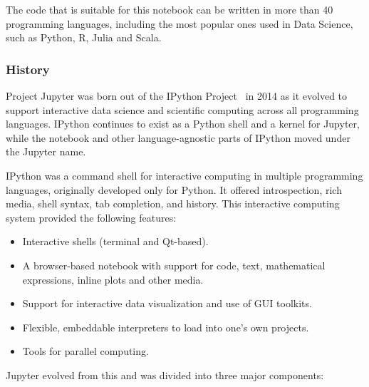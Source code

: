 The code that is suitable for this notebook can be written in more than 40 programming
languages, including the most popular ones used in Data Science, such as Python, R, Julia
and Scala.

\subsubsection{History}

Project Jupyter was born out of the IPython Project~\cite{ipython:on,ipython-wikipedia:on}
in 2014 as it evolved to support interactive data science and scientific computing across
all programming languages.  IPython continues to exist as a Python shell and a kernel for
Jupyter, while the notebook and other language-agnostic parts of IPython moved under the
Jupyter name.

IPython was a command shell for interactive computing in multiple programming languages,
originally developed only for Python. It offered introspection, rich media, shell syntax,
tab completion, and history. This interactive computing system provided the following
features:

\begin{itemize}
\item Interactive shells (terminal and Qt-based).
\item A browser-based notebook with support for code, text, mathematical expressions,
  inline plots and other media.
\item Support for interactive data visualization and use of GUI toolkits.
\item Flexible, embeddable interpreters to load into one's own projects.
\item Tools for parallel computing.
\end{itemize}

Jupyter evolved from this and was divided into three major components:
 
